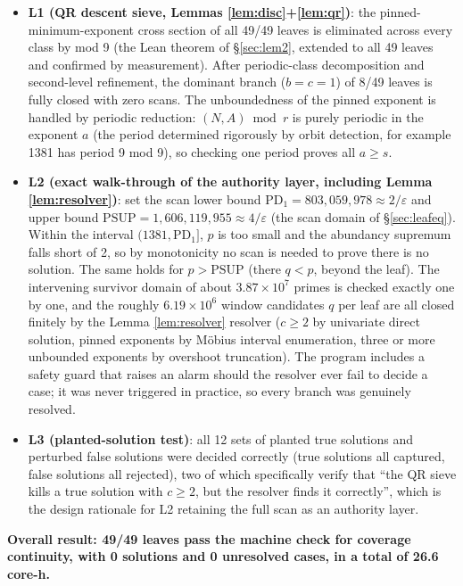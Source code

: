 \documentclass[11pt]{article}
\theoremstyle{remark}
\newcommand{\PSUP}{\mathrm{PSUP}}
\begin{document}
\begin{itemize}
\item \textbf{L1 (QR descent sieve, Lemmas \ref{lem:disc}+\ref{lem:qr})}: the pinned-minimum-exponent cross section of all 49/49 leaves is eliminated across every class by mod 9 (the Lean theorem of \S\ref{sec:lem2}, extended to all 49 leaves and confirmed by measurement). After periodic-class decomposition and second-level refinement, the dominant branch ($b = c = 1$) of 8/49 leaves is fully closed with zero scans. The unboundedness of the pinned exponent is handled by periodic reduction: $(N, A) \bmod r$ is purely periodic in the exponent $a$ (the period determined rigorously by orbit detection, for example 1381 has period 9 mod 9), so checking one period proves all $a \ge s$.
\item \textbf{L2 (exact walk-through of the authority layer, including Lemma \ref{lem:resolver})}: set the scan lower bound $\mathrm{PD}_1 = 803{,}059{,}978 \approx 2/\varepsilon$ and upper bound $\PSUP = 1{,}606{,}119{,}955 \approx 4/\varepsilon$ (the scan domain of \S\ref{sec:leafeq}). Within the interval $(1381, \mathrm{PD}_1]$, $p$ is too small and the abundancy supremum falls short of 2, so by monotonicity no scan is needed to prove there is no solution. The same holds for $p > \PSUP$ (there $q < p$, beyond the leaf). The intervening survivor domain of about $3.87 \times 10^7$ primes is checked exactly one by one, and the roughly $6.19 \times 10^6$ window candidates $q$ per leaf are all closed finitely by the Lemma \ref{lem:resolver} resolver ($c \ge 2$ by univariate direct solution, pinned exponents by M\"obius interval enumeration, three or more unbounded exponents by overshoot truncation). The program includes a safety guard that raises an alarm should the resolver ever fail to decide a case; it was never triggered in practice, so every branch was genuinely resolved.
\item \textbf{L3 (planted-solution test)}: all 12 sets of planted true solutions and perturbed false solutions were decided correctly (true solutions all captured, false solutions all rejected), two of which specifically verify that ``the QR sieve kills a true solution with $c \ge 2$, but the resolver finds it correctly'', which is the design rationale for L2 retaining the full scan as an authority layer.
\end{itemize}

\textbf{Overall result: 49/49 leaves pass the machine check for coverage continuity, with 0 solutions and 0 unresolved cases, in a total of 26.6 core-h.}
\end{document}
